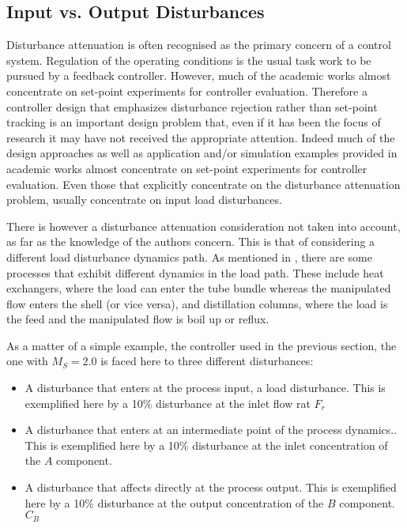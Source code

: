\subsection{Input vs. Output Disturbances}
%
Disturbance attenuation is often recognised as the primary concern of a control system. Regulation of the operating conditions is the usual task work to be pursued by a feedback controller. However, much of the academic works almost concentrate on set-point experiments for controller evaluation.  Therefore a controller design that emphasizes disturbance rejection rather than set-point tracking is an important design problem that, even if it has been the focus of research it may have not received the appropriate attention. Indeed much of the design approaches as well as application and/or simulation examples provided in academic works almost concentrate on set-point experiments for controller evaluation. Even those that explicitly concentrate on the disturbance attenuation problem, usually concentrate on input load disturbances.

There is however a disturbance attenuation consideration not taken into account, as far as the knowledge of the authors concern. This is that of considering a different load disturbance dynamics path. As mentioned in \cite{Shinskey2002}, there are some processes that exhibit different dynamics in the load path. These include heat exchangers, where the load can enter the tube bundle whereas the manipulated flow enters the shell (or vice versa), and distillation columns, where the load is the feed and the manipulated flow is boil up or reflux.

As a matter of a simple example, the controller used in the previous section, the one with $M_S=2.0$ is faced here to three different disturbances:
%
\begin{itemize}
\item A disturbance that  enters at the process input, a load disturbance. This is exemplified here by a 10\% disturbance at the inlet flow rat $F_r$ 
\item A disturbance that enters at  an intermediate point of the process dynamics.. This is exemplified here by a 10\% disturbance at the inlet concentration of the $A$ component.
\item A disturbance that affects directly at the process output. This is exemplified here by a 10\% disturbance at the output concentration of the $B$ component. $C_B$
 \end{itemize} 

